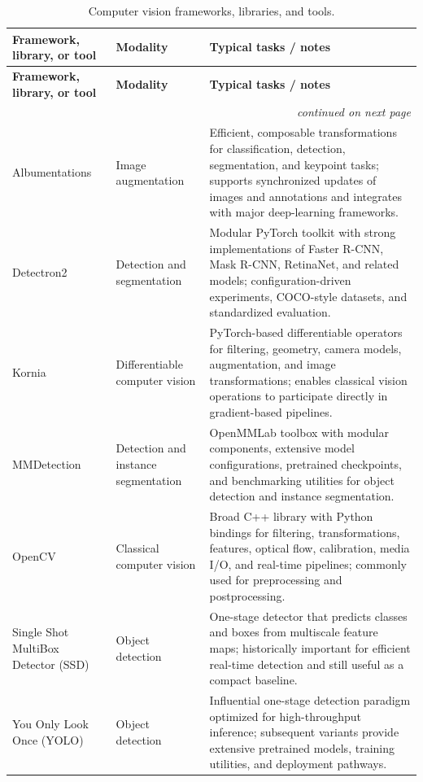 \documentclass{article}
\newcounter{entry}[section]
\renewcommand{\theentry}{\thesection.\arabic{entry}}
\newcommand{\EntryRow}[5]{
    \noalign{
        \stepcounter{entry}
        \xdef\ENTRYNUM{\theentry}
        \phantomsection\label{entry:#1}
        \addcontentsline{toc}{subsubsection}{\ENTRYNUM\hspace{0.5cm}#2}
    }
    #2 #3 & #4 & #5 \\
    \hline
}
\begin{document}
\begin{longtable}{|p{}|p{}|p{}|}
    \caption{Computer vision frameworks, libraries, and tools.} \\


    \hline
    \textbf{Framework, library, or tool} & \textbf{Modality} & \textbf{Typical tasks / notes} \\
    \hline
    \endfirsthead

    \hline
    \textbf{Framework, library, or tool} & \textbf{Modality} & \textbf{Typical tasks / notes} \\
    \hline
    \endhead

    \multicolumn{3}{r}{\textit{continued on next page}} \\
    \endfoot

    \endlastfoot


    \EntryRow{albumentations}{Albumentations}{\cite{buslaev2020albumentations}}{Image augmentation}{Efficient, composable transformations for classification, detection, segmentation, and keypoint tasks; supports synchronized updates of images and annotations and integrates with major deep-learning frameworks.}

    \EntryRow{detectron2}{Detectron2}{\cite{wu2019detectron2}}{Detection and segmentation}{Modular PyTorch toolkit with strong implementations of Faster R-CNN, Mask R-CNN, RetinaNet, and related models; configuration-driven experiments, COCO-style datasets, and standardized evaluation.}

    \EntryRow{kornia}{Kornia}{\cite{riba2020kornia}}{Differentiable computer vision}{PyTorch-based differentiable operators for filtering, geometry, camera models, augmentation, and image transformations; enables classical vision operations to participate directly in gradient-based pipelines.}

    \EntryRow{mmdetection}{MMDetection}{\cite{chen2019mmdetection}}{Detection and instance segmentation}{OpenMMLab toolbox with modular components, extensive model configurations, pretrained checkpoints, and benchmarking utilities for object detection and instance segmentation.}

    \EntryRow{opencv}{OpenCV}{\cite{bradski2000opencv}}{Classical computer vision}{Broad C++ library with Python bindings for filtering, transformations, features, optical flow, calibration, media I/O, and real-time pipelines; commonly used for preprocessing and postprocessing.}

    \EntryRow{ssd}{Single Shot MultiBox Detector (SSD)}{\cite{liu2016ssd}}{Object detection}{One-stage detector that predicts classes and boxes from multiscale feature maps; historically important for efficient real-time detection and still useful as a compact baseline.}

    \EntryRow{yolo}{You Only Look Once (YOLO)}{\cite{redmon2016you}}{Object detection}{Influential one-stage detection paradigm optimized for high-throughput inference; subsequent variants provide extensive pretrained models, training utilities, and deployment pathways.}
\end{longtable}
\end{document}

